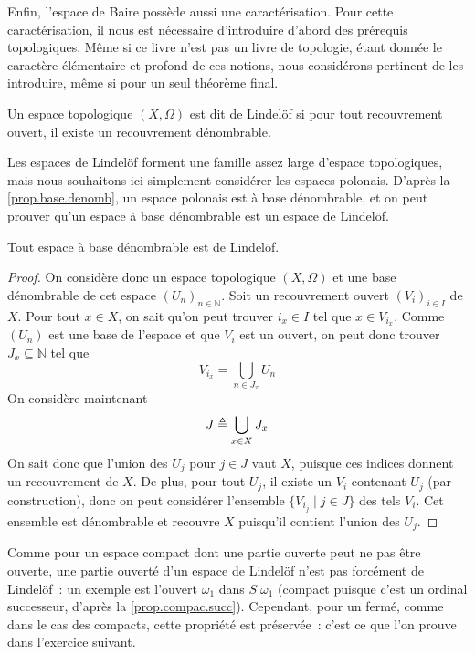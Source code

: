 Enfin, l'espace de Baire possède aussi une caractérisation. Pour cette
caractérisation, il nous est nécessaire d'introduire d'abord des prérequis
topologiques. Même si ce livre n'est pas un livre de topologie, étant donnée le
caractère élémentaire et profond de ces notions, nous considérons pertinent de
les introduire, même si pour un seul théorème final.

\begin{definition}
  Un espace topologique $(X,\Omega)$ est dit de Lindelöf si pour tout
  recouvrement ouvert, il existe un recouvrement dénombrable.
\end{definition}

Les espaces de Lindelöf forment une famille assez large d'espace topologiques,
mais nous souhaitons ici simplement considérer les espaces polonais. D'après
la \cref{prop.base.denomb}, un espace polonais est à base dénombrable, et on
peut prouver qu'un espace à base dénombrable est un espace de Lindelöf.

\begin{lemma}[Lindelöf]\label{lem.lindelof}
  Tout espace à base dénombrable est de Lindelöf.
\end{lemma}

\begin{proof}
  On considère donc un espace topologique $(X,\Omega)$ et une base dénombrable
  de cet espace $(U_n)_{n \in \mathbb N}$. Soit un recouvrement ouvert
  $(V_i)_{i \in I}$ de $X$. Pour tout $x \in X$, on sait qu'on peut trouver
  $i_x \in I$ tel que $x \in V_{i_x}$. Comme $(U_n)$ est une base de l'espace et
  que $V_i$ est un ouvert, on peut donc trouver $J_x \subseteq \mathbb N$ tel
  que
  \[V_{i_x} = \bigcup_{n \in J_x} U_n\]
  On considère maintenant
  \[J \triangleq \bigcup_{x \in X} J_x\]
  On sait donc que l'union des $U_j$ pour $j \in J$ vaut $X$, puisque ces
  indices donnent un recouvrement de $X$. De plus, pour tout $U_j$, il existe
  un $V_i$ contenant $U_j$ (par construction), donc on peut considérer
  l'ensemble $\{V_{i_j}\mid j \in J\}$ des tels $V_i$. Cet ensemble est
  dénombrable et recouvre $X$ puisqu'il contient l'union des $U_j$.
\end{proof}

Comme pour un espace compact dont une partie ouverte peut ne pas être ouverte,
une partie ouverté d'un espace de Lindelöf n'est pas forcément de Lindelöf~:
un exemple est l'ouvert $\omega_1$ dans $S\;\omega_1$ (compact puisque c'est un
ordinal successeur, d'après la \cref{prop.compac.succ}). Cependant, pour un
fermé, comme dans le cas des compacts, cette propriété est préservée~: c'est ce
que l'on prouve dans l'exercice suivant.

